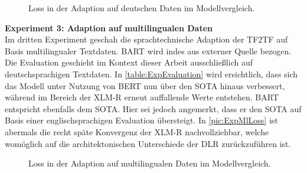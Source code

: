 \begin{figure}[h]
  \centering
  \caption{Loss in der Adaption auf deutschen Daten im Modellvergleich.}
  \label{pic:ExpDeLoss}
\end{figure}

\noindent
\textbf{Experiment 3: Adaption auf multilingualen Daten}\\
\noindent
Im dritten Experiment geschah die sprachtechnische Adaption der \ac{TF2TF} auf Basis multilingualer Textdaten. \ac{BART} wird indes aus externer Quelle bezogen. Die Evaluation geschieht im Kontext dieser Arbeit ausschließlich auf deutschsprachigen Textdaten. In \autoref{table:ExpEvaluation} wird ersichtlich, dass sich das Modell unter Nutzung von \ac{BERT} nun über den \ac{SOTA} hinaus verbessert, während im Bereich der \ac{XLM-R} erneut auffallende Werte entstehen. \ac{BART} entspricht ebenfalls dem \ac{SOTA}. Hier sei jedoch angemerkt, dass er den \ac{SOTA} auf Basis einer englischsprachigen Evaluation übersteigt. In \autoref{pic:ExpMlLoss} ist abermals die recht späte Konvergenz der \ac{XLM-R} nachvollziehbar, welche womöglich auf die architektonischen Unterschiede der \ac{DLR} zurückzuführen ist.\\

\begin{figure}[h]
  \centering
  \caption{Loss in der Adaption auf multilingualen Daten im Modellvergleich.}
  \label{pic:ExpMlLoss}
\end{figure}
\newpage


